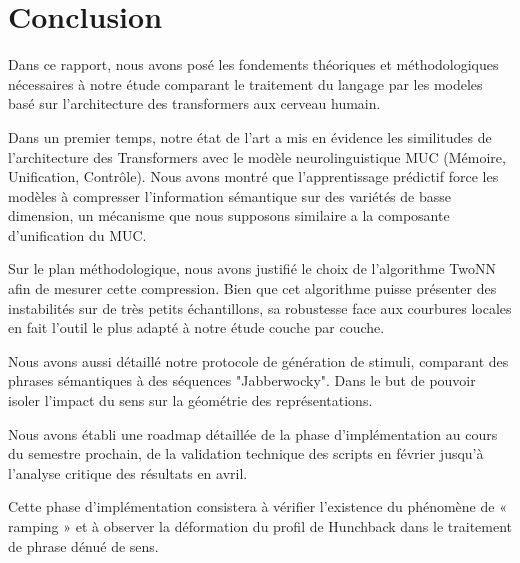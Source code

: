 \chapter*{Conclusion} %

Dans ce rapport, nous avons posé les fondements théoriques et méthodologiques nécessaires à notre étude comparant le traitement du langage par les modeles basé sur l'architecture des transformers aux cerveau humain. 



Dans un premier temps, notre état de l'art a mis en évidence les similitudes de l'architecture des Transformers avec le modèle neurolinguistique MUC (Mémoire, Unification, Contrôle). Nous avons montré que l'apprentissage prédictif force les modèles à compresser l'information sémantique sur des variétés de basse dimension, un mécanisme que nous supposons similaire a la composante d'unification du MUC.



Sur le plan méthodologique, nous avons justifié le choix de l'algorithme TwoNN afin de mesurer cette compression. Bien que cet algorithme puisse présenter des instabilités sur de très petits échantillons, sa robustesse face aux courbures locales en fait l'outil le plus adapté à notre étude couche par couche. 

Nous avons aussi détaillé notre protocole de génération de stimuli, comparant des phrases sémantiques à des séquences "Jabberwocky". Dans le but de pouvoir isoler l'impact du sens sur la géométrie des représentations.



 Nous avons établi une roadmap détaillée de la phase d'implémentation au cours du semestre prochain, de la validation technique des scripts en février jusqu'à l'analyse critique des résultats en avril.



Cette phase d'implémentation consistera à vérifier l'existence du phénomène de « ramping » et à observer la déformation du profil de Hunchback dans le traitement de phrase dénué de sens.

